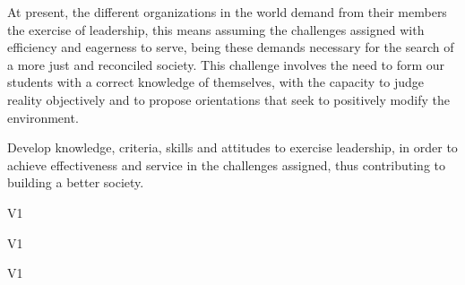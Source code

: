 \begin{syllabus}


\begin{justification}
	At present, the different organizations in the world demand from their members the exercise of leadership, this means assuming the challenges assigned with efficiency and eagerness to serve, being these demands necessary for the search of a more just and reconciled society. 
	This challenge involves the need to form our students with a correct knowledge of themselves, with the capacity to judge reality objectively and to propose orientations that seek to positively modify the environment.
\end{justification}

\begin{goals}
\item Develop knowledge, criteria, skills and attitudes to exercise leadership, in order to achieve effectiveness and service in the challenges assigned, thus contributing to building a better society.
\end{goals}

\begin{outcomes}{V1}
    \item {}
	\item {}
    \item {}
\end{outcomes}

\begin{specificoutcomes}{V1}
	\item {}
    \item {}
	\item {}
	\item {}
    \item {}
    \item {}
    \item {}
\end{specificoutcomes}

\begin{competences}{V1}
    \item {}
    \item {}
    \item {}
\end{competences}


\end{syllabus}
